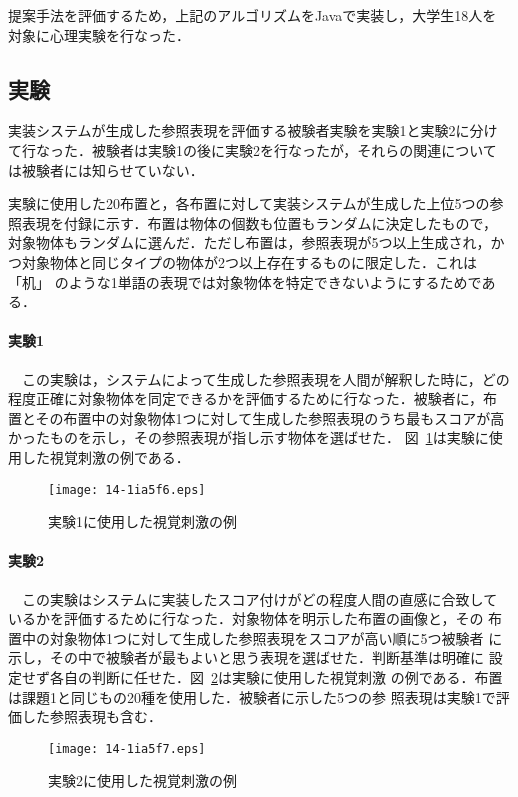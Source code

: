 \documentclass[japanese]{jnlp_1.2}
\begin{document}
提案手法を評価するため，上記のアルゴリズムをJavaで実装し，大学生18人を
対象に心理実験を行なった．

\subsection{実験}

実装システムが生成した参照表現を評価する被験者実験を実験1と実験2に分け
て行なった．被験者は実験1の後に実験2を行なったが，それらの関連について
は被験者には知らせていない．

実験に使用した20布置と，各布置に対して実装システムが生成した上位5つの参
照表現を付録に示す．布置は物体の個数も位置もランダムに決定したもので，
対象物体もランダムに選んだ．ただし布置は，参照表現が5つ以上生成され，か
つ対象物体と同じタイプの物体が2つ以上存在するものに限定した．これは「机」
のような1単語の表現では対象物体を特定できないようにするためである．

\paragraph{実験1}
　この実験は，システムによって生成した参照表現を人間が解釈した時に，どの
程度正確に対象物体を同定できるかを評価するために行なった．被験者に，布
置とその布置中の対象物体1つに対して生成した参照表現のうち最もスコアが高
かったものを示し，その参照表現が指し示す物体を選ばせた．
図~\ref{fig:Eval1}は実験に使用した視覚刺激の例である．

\begin{figure}[t]
  \begin{center}
    \texttt{[image: 14-1ia5f6.eps]}
    \caption{実験1に使用した視覚刺激の例}
    \label{fig:Eval1}
  \end{center}
\end{figure}

\paragraph{実験2}
　この実験はシステムに実装したスコア付けがどの程度人間の直感に合致して
いるかを評価するために行なった．対象物体を明示した布置の画像と，その
布置中の対象物体1つに対して生成した参照表現をスコアが高い順に5つ被験者
に示し，その中で被験者が最もよいと思う表現を選ばせた．判断基準は明確に
設定せず各自の判断に任せた．図~\ref{fig:Eval2}は実験に使用した視覚刺激
の例である．布置は課題1と同じもの20種を使用した．被験者に示した5つの参
照表現は実験1で評価した参照表現も含む．

\begin{figure}[t]
  \begin{center}
    \texttt{[image: 14-1ia5f7.eps]}
    \caption{実験2に使用した視覚刺激の例}
    \label{fig:Eval2}
  \end{center}
\end{figure}
\end{document}
